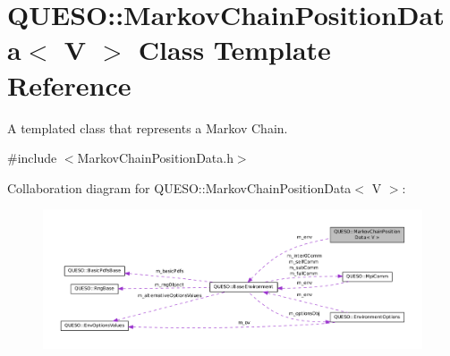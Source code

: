 \hypertarget{class_q_u_e_s_o_1_1_markov_chain_position_data}{\section{Q\-U\-E\-S\-O\-:\-:Markov\-Chain\-Position\-Data$<$ V $>$ Class Template Reference}
\label{class_q_u_e_s_o_1_1_markov_chain_position_data}
}


A templated class that represents a Markov Chain.  




{\ttfamily \#include $<$Markov\-Chain\-Position\-Data.\-h$>$}



Collaboration diagram for Q\-U\-E\-S\-O\-:\-:Markov\-Chain\-Position\-Data$<$ V $>$\-:
\nopagebreak
\begin{figure}[H]
\begin{center}
\leavevmode
\includegraphics[width=350pt]{class_q_u_e_s_o_1_1_markov_chain_position_data__coll__graph}
\end{center}
\end{figure}
